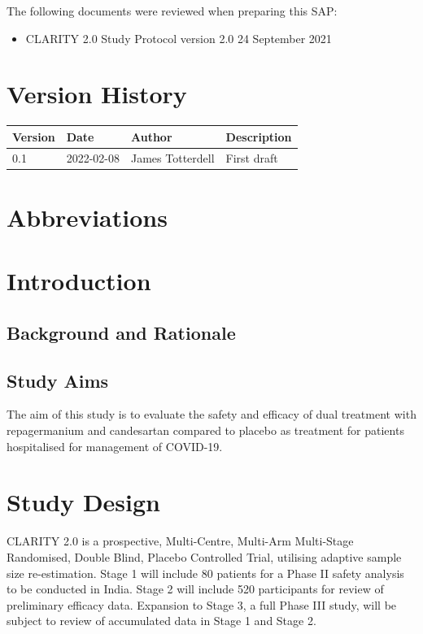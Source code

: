 \documentclass[11pt,parskip=half-]{scrartcl}
\begin{document}
The following documents were reviewed when preparing this SAP:
\begin{itemize}
    \item CLARITY 2.0 Study Protocol version 2.0 24 September 2021
\end{itemize}

\section*{Version History}

\begin{table}[H]
    \begin{center}
        \begin{tabular}{lllp{5cm}}
            \hline
            Version & Date       & Author           & Description \\
            \hline
            0.1     & 2022-02-08 & James Totterdell & First draft \\
            \hline
        \end{tabular}
    \end{center}
\end{table}

\section*{Abbreviations}

\clearpage

\section{Introduction}

\subsection{Background and Rationale}

\subsection{Study Aims}
The aim of this study is to evaluate the safety and efficacy of dual treatment with repagermanium and candesartan compared to placebo as treatment for patients hospitalised for management of COVID-19.

\clearpage

\section{Study Design}
CLARITY 2.0 is a prospective, Multi-Centre, Multi-Arm Multi-Stage Randomised, Double Blind, Placebo Controlled Trial, utilising adaptive sample size re-estimation. Stage 1 will include 80 patients for a Phase II safety analysis to be conducted in India. Stage 2 will include 520 participants for review of preliminary efficacy data. Expansion to Stage 3, a full Phase III study, will be subject to review of accumulated data in Stage 1 and Stage 2.
\end{document}
